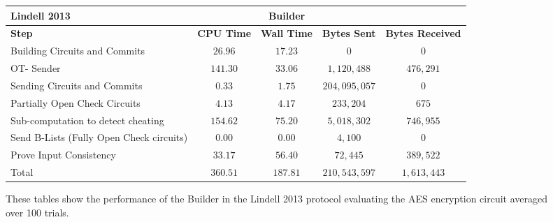 \documentclass[ %
                    author={Nicholas Tutte},
                supervisor={Prof. Nigel Smart},
                    degree={MEng},
                     title={Secure Two Party Computation},
                  subtitle={A practical comparison of recent protocols},
                      type={Research - GG1K},
                      year={2015} ]{dissertation}
\begin{document}
				\begin{figure}
					\begin{tabular}{| p{3.5cm} | c c c c |}
						\hline
						\textbf{Lindell 2013} & & \textbf{Builder} & & \\
						\hline
						\textbf{Step} & \textbf{CPU Time} & \textbf{Wall Time} & \textbf{Bytes Sent} & \textbf{Bytes Received} \\
						\thickhline
						Building Circuits and Commits & $26.96$ & $17.23$ & $0$ & $0$ \\
						\hline
						OT- Sender & $141.30$ & $33.06$ & $1,120,488$ & $476,291$ \\
						\hline
						Sending Circuits and Commits & $0.33$ & $1.75$ & $204,095,057$ & $0$ \\
						\hline
						Partially Open Check Circuits & $4.13$ & $4.17$ & $233,204$ & $675$ \\
						\hline
						Sub-computation to detect cheating & $154.62$ & $75.20$ & $5,018,302$ & $746,955$ \\
						\hline
						Send B-Lists (Fully Open Check circuits) & $0.00$ & $0.00$ & $4,100$ & $0$ \\
						\hline
						Prove Input Consistency & $33.17$ & $56.40$ & $72,445$ & $389,522$ \\
						\thickhline
						Total & $360.51$ & $187.81$ & $210,543,597$ & $1,613,443$ \\
						\hline
					\end{tabular}
					\caption{These tables show the performance of the Builder in the Lindell 2013 protocol evaluating the AES encryption circuit averaged over 100 trials. \label{table:L_2013_AES_Builder}}
				\end{figure}
\end{document}
